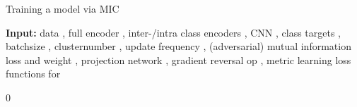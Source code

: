 

\begin{algorithm}[t]
\label{alg:algorithm}
\caption{Training a model via MIC}


\SetAlgoLined
\textbf{Input:} data , full encoder , inter-/intra class encoders , CNN , class targets ,  batchsize , clusternumber , update frequency , (adversarial) mutual information loss  and weight , projection network , gradient reversal op , metric learning loss functions for  
\newline

 \Cluster{\Stand{\Embed{, , }}, }

  0

\end{algorithm}


